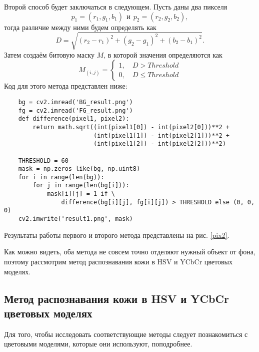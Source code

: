 Второй способ будет заключаться в следующем. Пусть даны два пикселя 
\begin{equation}
	p_1 = (r_1, g_1, b_1)~~и~~p_2 = (r_2, g_2, b_2),
	\label{pixels_bg}
\end{equation}
тогда различие между ними будем определять как
\begin{equation}
	D = \sqrt{(r_2 - r_1)^2 + (g_2 - g_1)^2 + (b_2 - b_1)^2}.
	\label{distance}
\end{equation}
Затем создаём битовую маску $M$, в которой значения определяются как
\begin{equation}
	M_{(i,j)}=\left\{\begin{aligned}
	1,~& D > Threshold\\
	0,~& D \leq Threshold
\end{aligned}\right. 
\label{bite-mask}
\end{equation}
Код для этого метода представлен ниже:
\begin{verbatim}
    bg = cv2.imread('BG_result.png')
    fg = cv2.imread('FG_result.png')
    def difference(pixel1, pixel2):
        return math.sqrt((int(pixel1[0]) - int(pixel2[0]))**2 +
                         (int(pixel1[1]) - int(pixel2[1]))**2 +
                         (int(pixel1[2]) - int(pixel2[2]))**2)

    THRESHOLD = 60
    mask = np.zeros_like(bg, np.uint8)
    for i in range(len(bg)):
        for j in range(len(bg[i])):
            mask[i][j] = 1 if \
            	difference(bg[i][j], fg[i][j]) > THRESHOLD else (0, 0, 0)
    cv2.imwrite('result1.png', mask)
\end{verbatim}

Результаты работы первого и второго метода представлены на рис. \ref{pix2}.

Как можно видеть, оба метода не совсем точно отделяют нужный объект от фона, поэтому 
рассмотрим метод распознавания кожи в HSV и YCbCr цветовых моделях.

\newpage

\subsection{Метод распознавания кожи в HSV и YCbCr цветовых моделях}

Для того, чтобы исследовать соответствующие методы следует познакомиться
 с цветовыми моделями, которые они используют, поподробнее.

